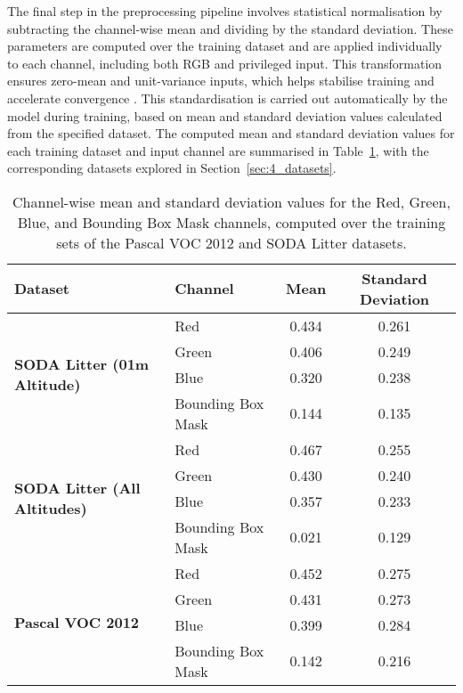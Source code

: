 The final step in the preprocessing pipeline involves statistical normalisation by subtracting the channel-wise mean and dividing by the standard deviation. These parameters are computed over the training dataset and are applied individually to each channel, including both RGB and privileged input. This transformation ensures zero-mean and unit-variance inputs, which helps stabilise training and accelerate convergence \cite{min_max_normalisation}. This standardisation is carried out automatically by the model during training, based on mean and standard deviation values calculated from the specified dataset. The computed mean and standard deviation values for each training dataset and input channel are summarised in Table~\ref{tab:channel_stats}, with the corresponding datasets explored in Section~\ref{sec:4_datasets}.

\begin{table}[ht]
    \centering
    \begin{tabular}{llcc}
        \toprule
        \textbf{Dataset} & \textbf{Channel} & \textbf{Mean} & \textbf{Standard Deviation} \\
        \midrule
        \multirow{4}{*}{\textbf{SODA Litter (01m Altitude)}} 
            & Red               & 0.434 & 0.261 \\
            & Green             & 0.406 & 0.249 \\
            & Blue              & 0.320 & 0.238 \\
            & Bounding Box Mask & 0.144 & 0.135 \\
        \midrule
        \multirow{4}{*}{\textbf{SODA Litter (All Altitudes)}} 
            & Red               & 0.467 & 0.255 \\
            & Green             & 0.430 & 0.240 \\
            & Blue              & 0.357 & 0.233 \\
            & Bounding Box Mask & 0.021 & 0.129 \\
        \midrule
        \multirow{4}{*}{\textbf{Pascal VOC 2012}} 
            & Red               & 0.452 & 0.275 \\
            & Green             & 0.431 & 0.273 \\
            & Blue              & 0.399 & 0.284 \\
            & Bounding Box Mask & 0.142 & 0.216 \\
        \bottomrule
    \end{tabular}
    \caption{Channel-wise mean and standard deviation values for the Red, Green, Blue, and Bounding Box Mask channels, computed over the training sets of the Pascal VOC 2012 and SODA Litter datasets.}
    \label{tab:channel_stats}
\end{table}

